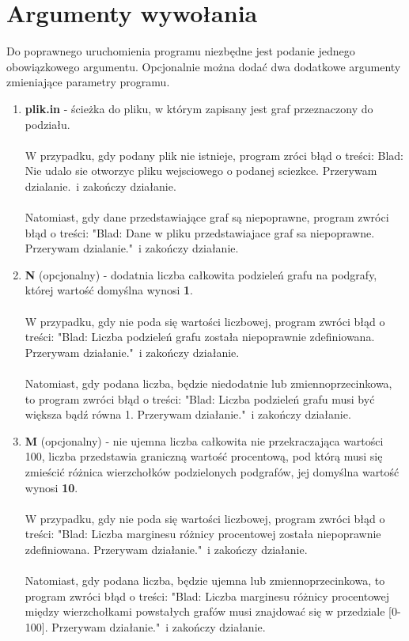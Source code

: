 \documentclass{article}
\begin{document}
\section*{Argumenty wywołania}
Do poprawnego uruchomienia programu niezbędne jest podanie jednego obowiązkowego argumentu. Opcjonalnie można dodać dwa dodatkowe argumenty zmieniające parametry programu.
\begin{enumerate}
    \item \textbf{plik.in} - ścieżka do pliku, w którym zapisany jest graf przeznaczony do podziału.\\\\
    W przypadku, gdy podany plik nie istnieje, program zróci błąd o treści: Blad: Nie udalo sie otworzyc pliku wejsciowego o podanej sciezkce. Przerywam dzialanie.\ i zakończy działanie.\\\\
    Natomiast, gdy dane przedstawiające graf są niepoprawne, program zwróci błąd o treści: "Blad: Dane w pliku przedstawiajace graf sa niepoprawne. Przerywam dzialanie."\ i zakończy działanie.
    
    \item \textbf{N} (opcjonalny) -  dodatnia liczba całkowita podzieleń grafu na podgrafy, której wartość domyślna wynosi \textbf{1}.\\\\
    W przypadku, gdy nie poda się wartości liczbowej, program zwróci błąd o treści: "Blad: Liczba podzieleń grafu została niepoprawnie zdefiniowana. Przerywam działanie."\ i zakończy działanie.\\\\
    Natomiast, gdy podana liczba, będzie niedodatnie lub zmiennoprzecinkowa, to program zwróci błąd o treści: "Blad: Liczba podzieleń grafu musi być większa bądź równa 1. Przerywam działanie."\ i zakończy działanie.

    \item \textbf{M} (opcjonalny) - nie ujemna liczba całkowita nie przekraczająca wartości 100, liczba przedstawia graniczną wartość procentową, pod którą musi się zmieścić różnica wierzchołków podzielonych podgrafów, jej domyślna wartość wynosi \textbf{10}.\\\\
    W przypadku, gdy nie poda się wartości liczbowej, program zwróci błąd o treści: "Blad: Liczba marginesu różnicy procentowej została niepoprawnie zdefiniowana. Przerywam działanie."\ i zakończy działanie.\\\\
    Natomiast, gdy podana liczba, będzie ujemna lub zmiennoprzecinkowa, to program zwróci błąd o treści: "Blad: Liczba marginesu różnicy procentowej między wierzchołkami powstałych grafów musi znajdować się w przedziale [0-100]. Przerywam działanie."\ i zakończy działanie.
\end{enumerate}
\end{document}
